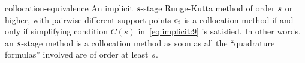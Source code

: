 \begin{Lemma}{collocation-equivalence}
  An implicit $s$-stage Runge-Kutta method of order $s$ or
  higher, with pairwise different support points $c_i$ is a
  collocation method if and only if simplifying condition $C(s)$
  in~\eqref{eq:implicit:9} is satisfied. In other words, an
  $s$-stage method is a collocation method as soon as all the
  ``quadrature formulas'' involved are of order at least $s$.
\end{Lemma}

